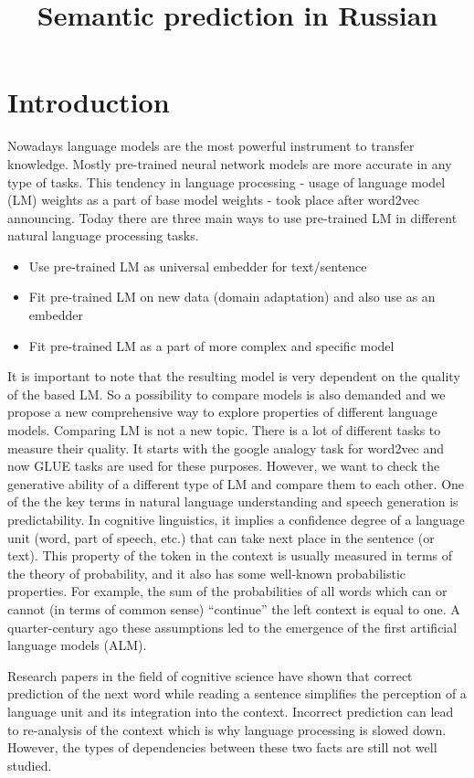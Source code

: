 \documentclass[a4paper]{article}
\title{Semantic prediction in {R}ussian}
\begin{document}
\maketitleabstract
\nocite{*}


\section{Introduction}

Nowadays language models are the most powerful instrument to transfer knowledge. Mostly pre-trained neural network models are more accurate in any type of tasks. This tendency in language processing - usage of language model (LM) weights as a part of base model weights - took place after word2vec announcing. Today there are three main ways to use pre-trained LM in different natural language processing tasks. 
\begin{itemize}
	\item Use pre-trained LM as universal embedder for text/sentence
	\item Fit pre-trained LM on new data (domain adaptation) and also use as an embedder
	\item Fit pre-trained LM as a part of more complex and specific model
\end{itemize}
It is important to note that the resulting model is very dependent on the quality of the based LM. So a possibility to compare models is also demanded and we propose a new comprehensive way to explore properties of different language models.
Comparing LM is not a new topic. There is a lot of different tasks to measure their quality. It starts with the google analogy task for word2vec \cite{mikolov2013efficient} and now GLUE tasks\cite{Wang2018GLUEAM} are used for these purposes. However, we want to check the generative ability of a different type of LM and compare them to each other.
One of the the key terms in natural language understanding and speech generation is predictability. In cognitive linguistics, it implies a confidence degree of a language unit (word, part of speech, etc.) that can take next place in the sentence (or text). This property of the token in the context is usually measured in terms of the theory of probability, and it also has some well-known probabilistic properties. For example, the sum of the probabilities of all words which can or cannot (in terms of common sense) “continue” the left context is equal to one. A quarter-century ago these assumptions led to the emergence of the first artificial language models (ALM).

Research papers in the field of cognitive science have shown that correct prediction of the next word while reading a sentence simplifies the perception of a language unit and its integration into the context. Incorrect prediction can lead to re-analysis of the context which is why language processing is slowed down. However, the types of dependencies between these two facts are still not well studied.
\end{document}
